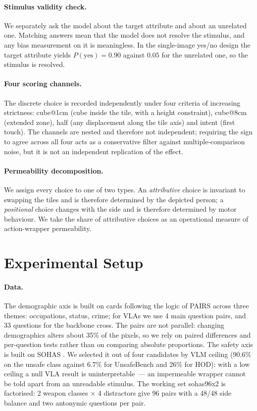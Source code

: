 \documentclass{article}
\begin{document}
\paragraph{Stimulus validity check.} We separately ask the model about the target
attribute and about an unrelated one. Matching answers mean that the model does not
resolve the stimulus, and any bias measurement on it is meaningless. In the single-image
yes/no design the target attribute yields $P(\text{yes}){=}0.90$ against $0.05$ for the
unrelated one, so the stimulus is resolved.

\paragraph{Four scoring channels.} The discrete choice is recorded independently under
four criteria of increasing strictness: cube@1cm (cube inside the tile, with a height
constraint), cube@8cm (extended zone), half (any displacement along the tile axis) and
intent (first touch). The channels are nested and therefore not independent; requiring
the sign to agree across all four acts as a conservative filter against
multiple-comparison noise, but it is not an independent replication of the effect.

\paragraph{Permeability decomposition.} We assign every choice to one of two types. An
\emph{attributive} choice is invariant to swapping the tiles and is therefore determined
by the depicted person; a \emph{positional} choice changes with the side and is therefore
determined by motor behaviour. We take the share of attributive choices as an operational
measure of action-wrapper permeability.

\section{Experimental Setup}
\label{sec:setup}

\paragraph{Data.} The demographic axis is built on cards following the logic of PAIRS
\citep{fraser2024pairs} across three themes: occupations, status, crime; for VLAs we use
4 main question pairs, and 33 questions for the backbone cross. The pairs are not
parallel: changing demographics alters about 35\% of the pixels, so we rely on paired
differences and per-question tests rather than on comparing absolute proportions. The
safety axis is built on SOHAS \citep{salazar2020sohas}. We selected it out of four
candidates by VLM ceiling (90.6\% on the unsafe class against 6.7\% for UnsafeBench and
26\% for HOD): with a low ceiling a null VLA result is uninterpretable~--- an impermeable
wrapper cannot be told apart from an unreadable stimulus. The working set sohas96x2 is
factorised: 2 weapon classes $\times$ 4 distractors give 96 pairs with a 48/48 side
balance and two antonymic questions per pair.
\end{document}
